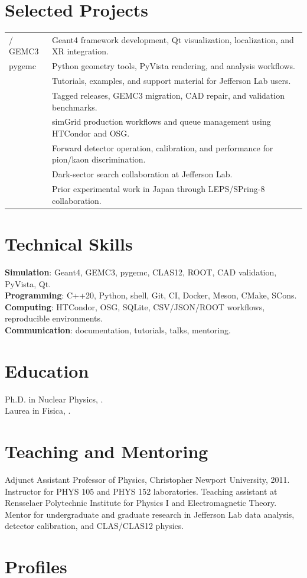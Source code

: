 \documentclass[10pt,letterpaper]{article}
\begin{document}
\section*{Selected Projects}
\begin{tabularx}{\textwidth}{@{}lX@{}}
\MauriGEMC{} / GEMC3 & Geant4 framework development, Qt visualization, localization, and XR integration.\\
pygemc & Python geometry tools, PyVista rendering, and analysis workflows.\\
\MauriGeantFourJLab{} & Tutorials, examples, and support material for Jefferson Lab users.\\
\MauriClasTwelve{} & Tagged releases, GEMC3 migration, CAD repair, and validation benchmarks.\\
\MauriOSG{} & simGrid production workflows and queue management using HTCondor and OSG.\\
\MauriLTCC{} & Forward detector operation, calibration, and performance for pion/kaon discrimination.\\
\MauriHPS{} & Dark-sector search collaboration at Jefferson Lab.\\
\MauriSPringEight{} & Prior experimental work in Japan through LEPS/SPring-8 collaboration.\\
\end{tabularx}

\section*{Technical Skills}
\textbf{Simulation}: Geant4, GEMC3, pygemc, CLAS12, ROOT, CAD validation, PyVista, Qt.\\
\textbf{Programming}: C++20, Python, shell, Git, CI, Docker, Meson, CMake, SCons.\\
\textbf{Computing}: HTCondor, OSG, SQLite, CSV/JSON/ROOT workflows, reproducible environments.\\
\textbf{Communication}: documentation, tutorials, talks, mentoring.

\newpage

\section*{Education}
Ph.D. in Nuclear Physics, \MauriRPI{}.\\
Laurea in Fisica, \MauriUniGe{}.

\section*{Teaching and Mentoring}
Adjunct Assistant Professor of Physics, Christopher Newport University, 2011. Instructor for PHYS 105 and PHYS 152 laboratories. Teaching assistant at Rensselaer Polytechnic Institute for Physics I and Electromagnetic Theory. Mentor for undergraduate and graduate research in Jefferson Lab data analysis, detector calibration, and CLAS/CLAS12 physics.

\section*{Profiles}
\MauriHomepage{} \quad \MauriGitHub{} \quad \MauriOrcid{}
\end{document}
